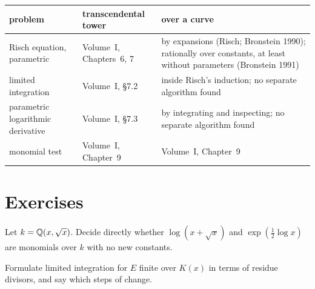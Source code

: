 \begin{center}
\begin{tabular}{@{}>{\raggedright}p{.33\linewidth}>{\raggedright}p{.27\linewidth}>{\raggedright\arraybackslash}p{.31\linewidth}@{}}
\toprule
problem & transcendental tower & over a curve \\
\midrule
Risch equation, parametric & Volume~I, Chapters~6, 7 & by expansions
  (Risch; Bronstein 1990); rationally over constants, at least without
  parameters (Bronstein 1991) \\
limited integration & Volume~I, \S7.2 & inside Risch's induction; no
  separate algorithm found \\
parametric logarithmic derivative & Volume~I, \S7.3 & by integrating and
  inspecting; no separate algorithm found \\
monomial test & Volume~I, Chapter~9 & Volume~I, Chapter~9 \\
\bottomrule
\end{tabular}
\end{center}

\section*{Exercises}

\begin{exercise}
Let $k = \mathbb{Q}(x, \sqrt{x})$. Decide directly whether $\log(x + \sqrt x)$ and
$\exp(\frac12 \log x)$ are monomials over $k$ with no new constants.
\end{exercise}

\begin{exercise}
Formulate limited integration for $E$ finite over $K(x)$ in terms of residue
divisors, and say which steps of  change.
\end{exercise}
